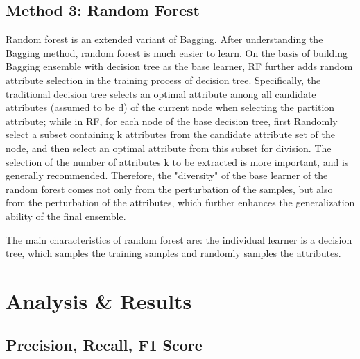 \documentclass[11pt]{report}
\begin{document}
\subsection{Method 3: Random Forest}
Random forest is an extended variant of Bagging. After understanding the Bagging method, random forest is much easier to learn. On the basis of building Bagging ensemble with decision tree as the base learner, RF further adds random attribute selection in the training process of decision tree. Specifically, the traditional decision tree selects an optimal attribute among all candidate attributes (assumed to be d) of the current node when selecting the partition attribute; while in RF, for each node of the base decision tree, first Randomly select a subset containing k attributes from the candidate attribute set of the node, and then select an optimal attribute from this subset for division. The selection of the number of attributes k to be extracted is more important, and is generally recommended. Therefore, the "diversity" of the base learner of the random forest comes not only from the perturbation of the samples, but also from the perturbation of the attributes, which further enhances the generalization ability of the final ensemble.

The main characteristics of random forest are: the individual learner is a decision tree, which samples the training samples and randomly samples the attributes.
\section{Analysis \& Results}

\subsection{Precision, Recall, F1 Score}


\end{document}
